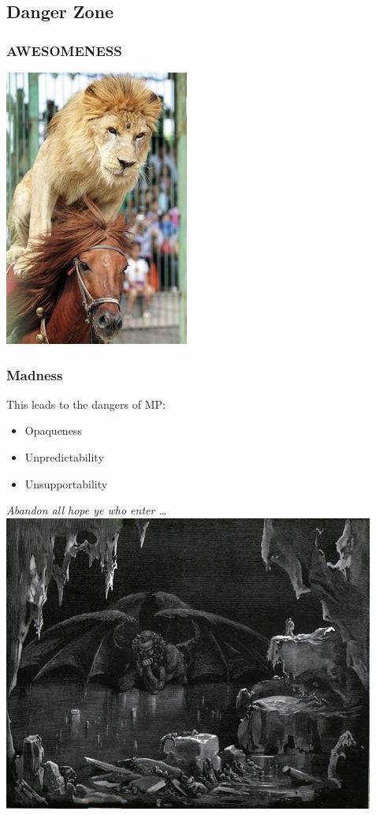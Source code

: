\documentclass[slidestop,compress,mathserif,notes]{beamer}
\begin{document}
\subsection{Danger Zone} %
\label{sub:danger_zone}

\begin{frame}
		\frametitle{AWESOMENESS}
		\begin{center}
			\includegraphics[scale=0.45]{img/lion_horse.jpg}
		\end{center}			
\end{frame}

\begin{frame}
	\frametitle{Madness}
	This leads to the dangers of MP:
	\begin{itemize}
		\item Opaqueness
		\item Unpredictability
		\item Unsupportability
	\end{itemize}
	\begin{center}
			\emph{Abandon all hope ye who enter \ldots}
		\includegraphics[scale=0.45]{img/dante.jpg}		
	\end{center}
\end{frame}
\end{document}
